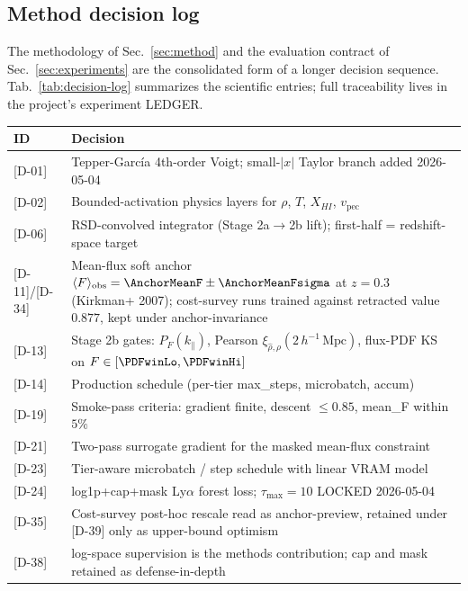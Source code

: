 \subsection{Method decision log}
The methodology of Sec.~\ref{sec:method} and the evaluation contract of Sec.~\ref{sec:experiments} are the consolidated form of a longer decision sequence. Tab.~\ref{tab:decision-log} summarizes the scientific entries; full traceability lives in the project's experiment LEDGER.

\begin{table}[t]
    \centering
    \renewcommand{\arraystretch}{1.15}
    \setlength{\tabcolsep}{4pt}
    \begin{tabular}{l|p{}}
    ID & Decision \\
    \hline
    {[D-01]} & Tepper-Garc\'ia 4th-order Voigt; small-$|x|$ Taylor branch added 2026-05-04 \\
    {[D-02]} & Bounded-activation physics layers for $\rho$, $T$, $X_{HI}$, $v_{\text{pec}}$ \\
    {[D-06]} & RSD-convolved integrator (Stage 2a$\to$2b lift); first-half = redshift-space target \\
    {[D-11]/[D-34]} & Mean-flux soft anchor $\langle F\rangle_{\text{obs}} = \AnchorMeanF \pm \AnchorMeanFsigma$ at $z=0.3$ (Kirkman+ 2007); cost-survey runs trained against retracted value $0.877$, kept under anchor-invariance \\
    {[D-13]} & Stage 2b gates: $P_F(k_\parallel)$, Pearson $\xi_{\hat\rho,\rho}(2\,h^{-1}\,\text{Mpc})$, flux-PDF KS on $F\in[\PDFwinLo,\PDFwinHi]$ \\
    {[D-14]} & Production schedule (per-tier max\_steps, microbatch, accum) \\
    {[D-19]} & Smoke-pass criteria: gradient finite, descent $\leq 0.85$, mean\_F within $5\%$ \\
    {[D-21]} & Two-pass surrogate gradient for the masked mean-flux constraint \\
    {[D-23]} & Tier-aware microbatch / step schedule with linear VRAM model \\
    {[D-24]} & log1p+cap+mask Ly$\alpha$ forest loss; $\tau_{\max}=10$ LOCKED 2026-05-04 \\
    {[D-35]} & Cost-survey post-hoc rescale read as anchor-preview, retained under [D-39] only as upper-bound optimism \\
    {[D-38]} & log-space supervision is the methods contribution; cap and mask retained as defense-in-depth \\

\end{tabular}
\end{table}
